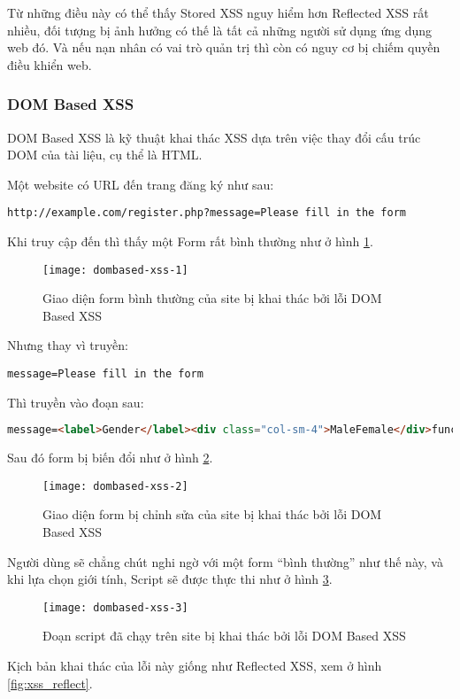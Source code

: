 \documentclass[../main-report.tex]{subfiles}
\begin{document}
Từ những điều này có thể thấy Stored XSS nguy hiểm hơn Reflected XSS rất nhiều, đối tượng bị ảnh hưởng có thế là tất cả những người sử dụng ứng dụng web đó. Và nếu nạn nhân có vai trò quản trị thì còn có nguy cơ bị chiếm quyền điều khiển web.

\subsubsection*{DOM Based XSS}
DOM Based XSS là kỹ thuật khai thác XSS dựa trên việc thay đổi cấu trúc DOM của tài liệu, cụ thể là HTML. 

\begin{example}
Một website có URL đến trang đăng ký như sau:

\begin{lstlisting}
http://example.com/register.php?message=Please fill in the form
\end{lstlisting}
\end{example}

Khi truy cập đến thì thấy một Form rất bình thường như ở hình \ref{fig:xss_dombased_1}.

\begin{figure}[ht!]
\centering\texttt{[image: dombased-xss-1]}
\caption{Giao diện form bình thường của site bị khai thác bởi lỗi DOM Based XSS}
\label{fig:xss_dombased_1}
\end{figure}

Nhưng thay vì truyền:

\begin{lstlisting}
message=Please fill in the form
\end{lstlisting}

Thì truyền vào đoạn sau:

\begin{lstlisting}[language=HTML]
message=<label>Gender</label><div class="col-sm-4">MaleFemale</div>function show(){alert();}
\end{lstlisting}

Sau đó form bị biến đổi như ở hình \ref{fig:xss_dombased_2}.

\begin{figure}[ht!]
\centering\texttt{[image: dombased-xss-2]}
\caption{Giao diện form bị chỉnh sửa của site bị khai thác bởi lỗi DOM Based XSS}
\label{fig:xss_dombased_2}
\end{figure}

Người dùng sẽ chẳng chút nghi ngờ với một form ``bình thường'' như thế này, và khi lựa chọn giới tính, Script sẽ được thực thi như ở hình \ref{fig:xss_dombased_3}.

\begin{figure}[ht!]
\centering\texttt{[image: dombased-xss-3]}
\caption{Đoạn script đã chạy trên site bị khai thác bởi lỗi DOM Based XSS}
\label{fig:xss_dombased_3}
\end{figure}

Kịch bản khai thác của lỗi này giống như Reflected XSS, xem ở hình \ref{fig:xss_reflect}.
\end{document}
